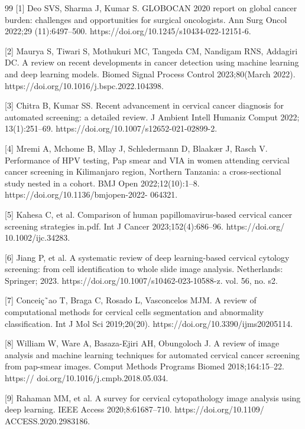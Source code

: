\documentclass[final,5p,times,twocolumn,authoryear]{elsarticle}
\begin{document}
\begin{thebibliography}{99} [1] Deo SVS, Sharma J, Kumar S. GLOBOCAN 2020 report on global cancer burden: challenges and opportunities for surgical oncologists. Ann Surg Oncol 2022;29 (11):6497–500. https://doi.org/10.1245/s10434-022-12151-6.

 [2] Maurya S, Tiwari S, Mothukuri MC, Tangeda CM, Nandigam RNS, Addagiri DC. A review on recent developments in cancer detection using machine learning and deep learning models. Biomed Signal Process Control 2023;80(March 2022). https://doi.org/10.1016/j.bspc.2022.104398.

 [3] Chitra B, Kumar SS. Recent advancement in cervical cancer diagnosis for automated screening: a detailed review. J Ambient Intell Humaniz Comput 2022; 13(1):251–69. https://doi.org/10.1007/s12652-021-02899-2.

 [4] Mremi A, Mchome B, Mlay J, Schledermann D, Blaakær J, Rasch V. Performance of HPV testing, Pap smear and VIA in women attending cervical cancer screening in Kilimanjaro region, Northern Tanzania: a cross-sectional study nested in a cohort. BMJ Open 2022;12(10):1–8. https://doi.org/10.1136/bmjopen-2022- 064321.

 [5] Kahesa C, et al. Comparison of human papillomavirus-based cervical cancer screening strategies in.pdf. Int J Cancer 2023;152(4):686–96. https://doi.org/ 10.1002/ijc.34283.

 [6] Jiang P, et al. A systematic review of deep learning-based cervical cytology screening: from cell identification to whole slide image analysis. Netherlands: Springer; 2023. https://doi.org/10.1007/s10462-023-10588-z. vol. 56, no. s2.

 [7] Conceiç˜ao T, Braga C, Rosado L, Vasconcelos MJM. A review of computational methods for cervical cells segmentation and abnormality classification. Int J Mol Sci 2019;20(20). https://doi.org/10.3390/ijms20205114.

 [8] William W, Ware A, Basaza-Ejiri AH, Obungoloch J. A review of image analysis and machine learning techniques for automated cervical cancer screening from pap-smear images. Comput Methods Programs Biomed 2018;164:15–22. https:// doi.org/10.1016/j.cmpb.2018.05.034.

 [9] Rahaman MM, et al. A survey for cervical cytopathology image analysis using deep learning. IEEE Access 2020;8:61687–710. https://doi.org/10.1109/ ACCESS.2020.2983186.


\end{thebibliography}
\end{document}
